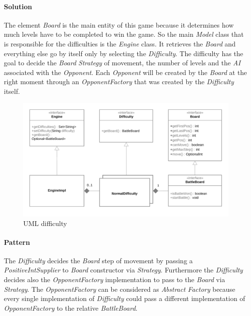 \documentclass[12pt, a4paper]{report}
\begin{document}
            \paragraph{Solution}

            The element \emph{Board} is the main entity of this game because it determines how much
            levels have to be completed to win the game. So the main \emph{Model} class that is responsible for
            the difficulties is the \emph{Engine} class. It retrieves the \emph{Board} and everything else go by itself
            only by selecting the \emph{Difficulty}. The difficulty has the goal to decide the \emph{Board} \emph{Strategy} of
            movement, the number of levels and the \emph{AI} associated with the \emph{Opponent}. Each \emph{Opponent} will
            be created by the \emph{Board} at the right moment through an \emph{OpponentFactory} that was created by the \emph{Difficulty}
            itself.

            \begin{figure}[ht]
            \centering{}
            \includegraphics[width=\textwidth]{difficulty}
            \caption{UML difficulty}
            \end{figure}

            \paragraph{Pattern}

            The \emph{Difficulty} decides the \emph{Board} step of movement by passing a \emph{PositiveIntSupplier} to \emph{Board} constructor via \emph{Strategy}.
            Furthermore the \emph{Difficulty} decides also the \emph{OpponentFactory} implementation to pass to the \emph{Board} via \emph{Strategy}.
            The \emph{OpponentFactory} can be considered as \emph{Abstract Factory} because every single implementation of \emph{Difficulty} could pass
            a different implementation of \emph{OpponentFactory} to the relative \emph{BattleBoard}.
\end{document}
